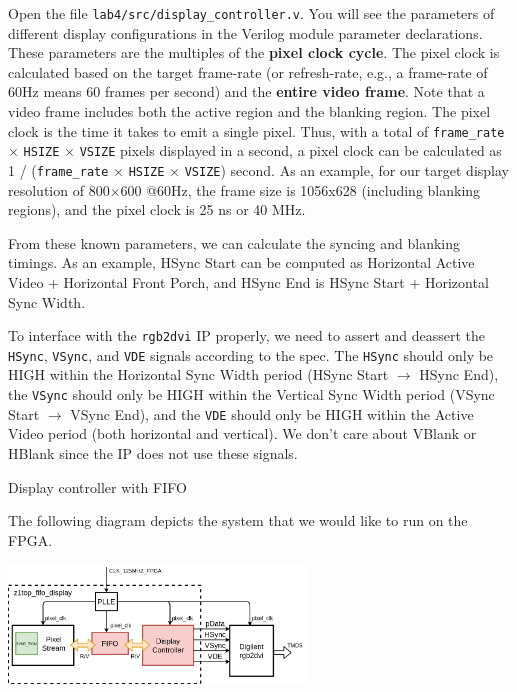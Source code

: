 \documentclass[11pt]{article}
\makeatletter
\renewcommand{\subsection}
{\@startsection {subsection}{1}{0pt}
 {-1ex}
 {0.5ex}
 {\bfseries\normalsize}}
\makeatother
\begin{document}
Open the file \verb|lab4/src/display_controller.v|. You will see the parameters of different display configurations in the Verilog module parameter declarations. These parameters are the multiples of the \textbf{pixel clock cycle}. The pixel clock is calculated based on the target frame-rate (or refresh-rate, e.g., a frame-rate of 60Hz means 60 frames per second) and the \textbf{entire video frame}. Note that a video frame includes both the active region and the blanking region. The pixel clock is the time it takes to emit a single pixel. Thus, with a total of \verb|frame_rate| $\times$ \verb|HSIZE| $\times$ \verb|VSIZE| pixels displayed in a second, a pixel clock can be calculated as 1 / (\verb|frame_rate| $\times$ \verb|HSIZE| $\times$ \verb|VSIZE|) second. As an example, for our target display resolution of 800$\times$600 @60Hz, the frame size is 1056x628 (including blanking regions), and the pixel clock is 25 ns or 40 MHz.

From these known parameters, we can calculate the syncing and blanking timings. As an example, HSync Start can be computed as Horizontal Active Video + Horizontal Front Porch, and HSync End is HSync Start + Horizontal Sync Width.

To interface with the \verb|rgb2dvi| IP properly, we need to assert and deassert the \verb|HSync|, \verb|VSync|, and \verb|VDE| signals according to the spec. The \verb|HSync| should only be HIGH within the Horizontal Sync Width period (HSync Start $\rightarrow$ HSync End), the \verb|VSync| should only be HIGH within the Vertical Sync Width period (VSync Start $\rightarrow$ VSync End), and the \verb|VDE| should only be HIGH within the Active Video period (both horizontal and vertical). We don't care about VBlank or HBlank since the IP does not use these signals.

\subsection{Display controller with FIFO}

The following diagram depicts the system that we would like to run on the FPGA.

\begin{center}
\includegraphics[width=0.6\textwidth]{figs/z1top_fifo_display.png}
\end{center}
\end{document}
